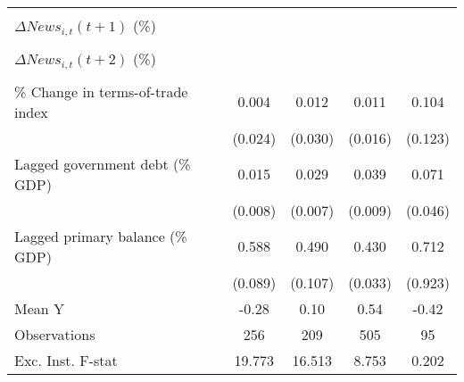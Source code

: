 {\begin{tabular}{l*{4}{c}}
                    &                     &                     &                     &                     \\
\addlinespace
$ \Delta News_{i,t}(t+1)$ (\%)&                     &                     &                     &                     \\
                    &                     &                     &                     &                     \\
\addlinespace
$ \Delta News_{i,t}(t+2)$ (\%)&                     &                     &                     &                     \\
                    &                     &                     &                     &                     \\
\addlinespace
\% Change in terms-of-trade index&       0.004         &       0.012         &       0.011         &       0.104         \\
                    &     (0.024)         &     (0.030)         &     (0.016)         &     (0.123)         \\
\addlinespace
Lagged government debt (\% GDP)&       0.015\sym{*}  &       0.029\sym{***}&       0.039\sym{***}&       0.071         \\
                    &     (0.008)         &     (0.007)         &     (0.009)         &     (0.046)         \\
\addlinespace
Lagged primary balance (\% GDP)&       0.588\sym{***}&       0.490\sym{***}&       0.430\sym{***}&       0.712         \\
                    &     (0.089)         &     (0.107)         &     (0.033)         &     (0.923)         \\
\midrule
Mean Y              &       -0.28         &        0.10         &        0.54         &       -0.42         \\
Observations        &         256         &         209         &         505         &          95         \\
Exc. Inst. F-stat   &      19.773         &      16.513         &       8.753         &       0.202         \\
\bottomrule
\end{tabular}
}
